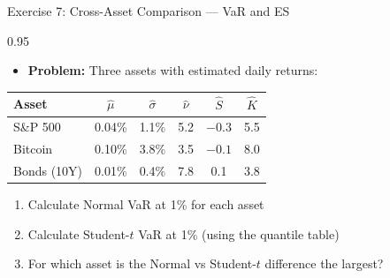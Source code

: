 \documentclass[9pt, aspectratio=169, t]{beamer}
\begin{document}
\begin{frame}{Exercise 7: Cross-Asset Comparison --- VaR and ES}
\begin{cminipage}{0.95\textwidth}
    \begin{itemize}\setlength{\itemsep}{0pt}
        \item \textbf{Problem:} Three assets with estimated daily returns:
    \end{itemize}
    \vspace{0.1cm}
    \small
    \renewcommand{\arraystretch}{1.2}
    \begin{tabular}{lccccc}
    \toprule
    \textbf{Asset} & $\hat{\mu}$ & $\hat{\sigma}$ & $\hat{\nu}$ & $\hat{S}$ & $\hat{K}$ \\
    \midrule
    S\&P 500 & 0.04\% & 1.1\% & 5.2 & $-0.3$ & 5.5 \\
    Bitcoin & 0.10\% & 3.8\% & 3.5 & $-0.1$ & 8.0 \\
    Bonds (10Y) & 0.01\% & 0.4\% & 7.8 & 0.1 & 3.8 \\
    \bottomrule
    \end{tabular}
    \normalsize
    \vspace{0.1cm}
    \begin{enumerate}\setlength{\itemsep}{0pt}
        \item Calculate Normal VaR at 1\% for each asset
        \item Calculate Student-$t$ VaR at 1\% (using the quantile table)
        \item For which asset is the Normal vs Student-$t$ difference the largest?
    \end{enumerate}
\end{cminipage}
\end{frame}
\end{document}
